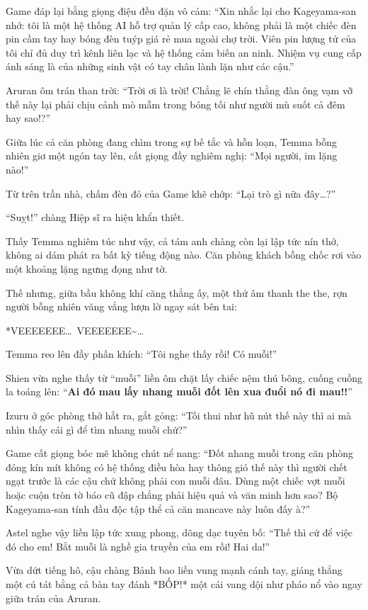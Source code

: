 \documentclass[../main.tex]{subfiles}
\begin{document}
Game đáp lại bằng giọng điệu đều đặn vô cảm: ``Xin nhắc lại cho Kageyama-san nhớ: tôi là một hệ thống AI hỗ trợ quản lý cấp cao, không phải là một chiếc đèn pin cầm tay hay bóng đèn tuýp giá rẻ mua ngoài chợ trời. Viên pin lượng tử của tôi chỉ đủ duy trì kênh liên lạc và hệ thống cảm biến an ninh. Nhiệm vụ cung cấp ánh sáng là của những sinh vật có tay chân lành lặn như các cậu.''

Aruran ôm trán than trời: ``Trời ơi là trời! Chẳng lẽ chín thằng đàn ông vạm vỡ thế này lại phải chịu cảnh mò mẫm trong bóng tối như người mù suốt cả đêm hay sao!?''

Giữa lúc cả căn phòng đang chìm trong sự bế tắc và hỗn loạn, Temma bỗng nhiên giơ một ngón tay lên, cất giọng đầy nghiêm nghị: ``Mọi người, im lặng nào!''

Từ trên trần nhà, chấm đèn đỏ của Game khẽ chớp: ``Lại trò gì nữa đây\dots?''

``Suỵt!'' chàng Hiệp sĩ ra hiệu khẩn thiết.

Thấy Temma nghiêm túc như vậy, cả tám anh chàng còn lại lập tức nín thở, không ai dám phát ra bất kỳ tiếng động nào. Căn phòng khách bỗng chốc rơi vào một khoảng lặng ngưng đọng như tờ.

Thế nhưng, giữa bầu không khí căng thẳng ấy, một thứ âm thanh the the, rợn người bỗng nhiên văng vẳng lượn lờ ngay sát bên tai:

*VEEEEEEE\dots\ VEEEEEEE\~{}\dots*

Temma reo lên đầy phấn khích: ``Tôi nghe thấy rồi! Có muỗi!''

Shien vừa nghe thấy từ ``muỗi'' liền ôm chặt lấy chiếc nệm thú bông, cuống cuồng la toáng lên: ``\textbf{Ai đó mau lấy nhang muỗi đốt lên xua đuổi nó đi mau!!}''

Izuru ở góc phòng thở hắt ra, gắt gỏng: ``Tối thui như hũ nút thế này thì ai mà nhìn thấy cái gì để tìm nhang muỗi chứ?''

Game cất giọng bóc mẽ không chút nể nang: ``Đốt nhang muỗi trong căn phòng đóng kín mít không có hệ thống điều hòa hay thông gió thế này thì người chết ngạt trước là các cậu chứ không phải con muỗi đâu. Dùng một chiếc vợt muỗi hoặc cuộn tròn tờ báo cũ đập chẳng phải hiệu quả và văn minh hơn sao? Bộ Kageyama-san tính đầu độc tập thể cả căn mancave này luôn đấy à?''

Astel nghe vậy liền lập tức xung phong, dõng dạc tuyên bố: ``Thế thì cứ để việc đó cho em! Bắt muỗi là nghề gia truyền của em rồi! Hai da!''

Vừa dứt tiếng hô, cậu chàng Bảnh bao liền vung mạnh cánh tay, giáng thẳng một cú tát bằng cả bàn tay đánh *BỐP!* một cái vang dội như pháo nổ vào ngay giữa trán của Aruran.
\end{document}
